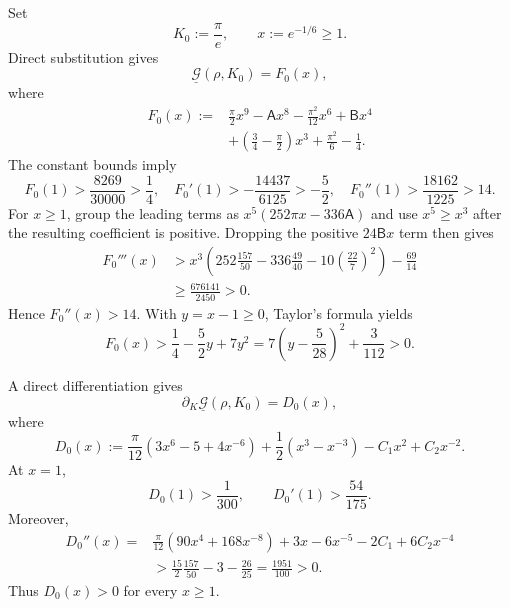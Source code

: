 Set
\begin{equation}
 K_0:=\frac\pi e,
 \qquad x:=e^{-1/6}\geq1.
 \label{rs:eq:base-x}
\end{equation}
Direct substitution gives
\begin{equation}
 \underline{\mathcal G}(\rho,K_0)=F_0(x),
 \label{rs:eq:G-base}
\end{equation}
where
\begin{equation}
 \begin{aligned}
 F_0(x):={}&\frac\pi2x^9-\mathsf A x^8
 -\frac{\pi^2}{12}x^6+\mathsf Bx^4\\
 &+\left(\frac34-\frac\pi2\right)x^3
 +\frac{\pi^2}{6}-\frac14.
 \end{aligned}
 \label{rs:eq:F0}
\end{equation}
The constant bounds imply
\begin{equation}
 F_0(1)>\frac{8269}{30000}>\frac14,
 \quad
 F_0'(1)>-\frac{14437}{6125}>-\frac52,
 \quad
 F_0''(1)>\frac{18162}{1225}>14.
 \label{rs:eq:F0-endpoint}
\end{equation}
For $x\geq1$, group the leading terms as
$x^5(252\pi x-336\mathsf A)$ and use $x^5\geq x^3$ after the
resulting coefficient is positive.  Dropping the positive
$24\mathsf Bx$ term then gives
\begin{equation}
 \begin{aligned}
 F_0'''(x)
 &>x^3\left(
 252\frac{157}{50}-336\frac{49}{40}
 -10\left(\frac{22}{7}\right)^2\right)-\frac{69}{14}\\
 &\geq\frac{676141}{2450}>0.
 \end{aligned}
 \label{rs:eq:F0-third}
\end{equation}
Hence $F_0''(x)>14$.  With $y=x-1\geq0$, Taylor's formula yields
\begin{equation}
 F_0(x)>\frac14-\frac52y+7y^2
 =7\left(y-\frac5{28}\right)^2+\frac3{112}>0.
 \label{rs:eq:F0-positive}
\end{equation}

A direct differentiation gives
\begin{equation}
 \partial_K\underline{\mathcal G}(\rho,K_0)=D_0(x),
 \label{rs:eq:base-derivative}
\end{equation}
where
\begin{equation}
 D_0(x):=
 \frac\pi{12}(3x^6-5+4x^{-6})
 +\frac12(x^3-x^{-3})-C_1x^2+C_2x^{-2}.
 \label{rs:eq:D0}
\end{equation}
At $x=1$,
\begin{equation}
 D_0(1)>\frac1{300},
 \qquad D_0'(1)>\frac{54}{175}.
 \label{rs:eq:D0-endpoint}
\end{equation}
Moreover,
\begin{equation}
 \begin{aligned}
 D_0''(x)={}&\frac\pi{12}(90x^4+168x^{-8})
 +3x-6x^{-5}-2C_1+6C_2x^{-4}\\
 &>\frac{15}{2}\frac{157}{50}-3-\frac{26}{25}
 =\frac{1951}{100}>0.
 \end{aligned}
 \label{rs:eq:D0-convex}
\end{equation}
Thus $D_0(x)>0$ for every $x\geq1$.

